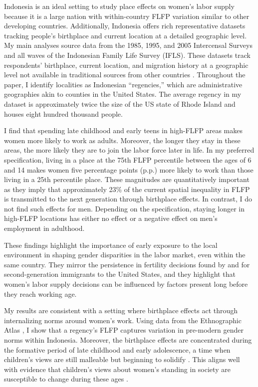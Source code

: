 Indonesia is an ideal setting to study place effects on women's labor supply because it is a large nation with within-country FLFP variation similar to other developing countries. Additionally, Indonesia offers rich representative datasets tracking people's birthplace and current location at a detailed geographic level. My main analyses source data from the 1985, 1995, and 2005 Intercensal Surveys and all waves of the Indonesian Family Life Survey (IFLS). These datasets track respondents' birthplace, current location, and migration history at a geographic level not available in traditional sources from other countries \citep{Bryan2019}. Throughout the paper, I identify localities as Indonesian ``regencies,'' which are administrative geographies akin to counties in the United States. The average regency in my dataset is approximately twice the size of the US state of Rhode Island and houses eight hundred thousand people.

I find that spending late childhood and early teens in high-FLFP areas makes women more likely to work as adults. Moreover, the longer they stay in these areas, the more likely they are to join the labor force later in life. In my preferred specification, living in a place at the 75th FLFP percentile between the ages of 6 and 14 makes women five percentage points (p.p.) more likely to work than those living in a 25th percentile place. These magnitudes are quantitatively important as they imply that approximately 23\% of the current spatial inequality in FLFP is transmitted to the next generation through birthplace effects. In contrast, I do not find such effects for men. Depending on the specification, staying longer in high-FLFP locations has either no effect or a negative effect on men's employment in adulthood.

These findings highlight the importance of early exposure to the local environment in shaping gender disparities in the labor market, even within the same country. They mirror the persistence in fertility decisions found by \cite{Fernandeza} and \cite{Fernandez2009} for second-generation immigrants to the United States, and they highlight that women's labor supply decisions can be influenced by factors present long before they reach working age.


My results are consistent with a setting where birthplace effects act through internalizing norms around women's work. Using data from the Ethnographic Atlas \citep{Murdock1967}, I show that a regency's FLFP captures variation in pre-modern gender norms within Indonesia. Moreover, the birthplace effects are concentrated during the formative period of late childhood and early adolescence, a time when children's views are still malleable but beginning to solidify \citep{Markus1986}. This aligns well with evidence that children's views about women's standing in society are susceptible to change during these ages \citep{Dhar2022,Olivettib}.

